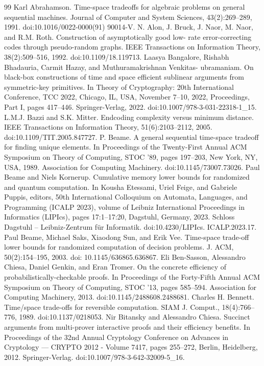 \begin{thebibliography}{99}
 Karl Abrahamson. Time-space tradeoffs for algebraic problems on general sequential machines. Journal of Computer and System Sciences, 43(2):269–289, 1991. doi:10.1016/0022-0000(91) 90014-V.
 N. Alon, J. Bruck, J. Naor, M. Naor, and R.M. Roth. Construction of asymptotically good low- rate error-correcting codes through pseudo-random graphs. IEEE Transactions on Information Theory, 38(2):509–516, 1992. doi:10.1109/18.119713.
 Laasya Bangalore, Rishabh Bhadauria, Carmit Hazay, and Muthuramakrishnan Venkitas- ubramaniam. On black-box constructions of time and space efficient sublinear arguments from symmetric-key primitives. In Theory of Cryptography: 20th International Conference, TCC 2022, Chicago, IL, USA, November 7–10, 2022, Proceedings, Part I, pages 417–446. Springer-Verlag, 2022. doi:10.1007/978-3-031-22318-1\_15.
 L.M.J. Bazzi and S.K. Mitter. Endcoding complexity versus minimum distance. IEEE Transactions on Information Theory, 51(6):2103–2112, 2005. doi:10.1109/TIT.2005.847727.
 P. Beame. A general sequential time-space tradeoff for finding unique elements. In Proceedings of the Twenty-First Annual ACM Symposium on Theory of Computing, STOC ’89, pages 197–203, New York, NY, USA, 1989. Association for Computing Machinery. doi:10.1145/73007.73026.
 Paul Beame and Niels Kornerup. Cumulative memory lower bounds for randomized and quantum computation. In Kousha Etessami, Uriel Feige, and Gabriele Puppis, editors, 50th International Colloquium on Automata, Languages, and Programming (ICALP 2023), volume
 of Leibniz International Proceedings in Informatics (LIPIcs), pages 17:1–17:20, Dagstuhl, Germany, 2023. Schloss Dagstuhl – Leibniz-Zentrum für Informatik. doi:10.4230/LIPIcs. ICALP.2023.17.
 Paul Beame, Michael Saks, Xiaodong Sun, and Erik Vee. Time-space trade-off lower bounds for randomized computation of decision problems. J. ACM, 50(2):154–195, 2003. doi: 10.1145/636865.636867.
 Eli Ben-Sasson, Alessandro Chiesa, Daniel Genkin, and Eran Tromer. On the concrete efficiency of probabilistically-checkable proofs. In Proceedings of the Forty-Fifth Annual ACM Symposium on Theory of Computing, STOC ’13, pages 585–594. Association for Computing Machinery, 2013. doi:10.1145/2488608.2488681.
 Charles H. Bennett. Time/space trade-offs for reversible computation. SIAM J. Comput., 18(4):766–776, 1989. doi:10.1137/0218053.
 Nir Bitansky and Alessandro Chiesa. Succinct arguments from multi-prover interactive proofs and their efficiency benefits. In Proceedings of the 32nd Annual Cryptology Conference on Advances in Cryptology — CRYPTO 2012 - Volume 7417, pages 255–272, Berlin, Heidelberg, 2012. Springer-Verlag. doi:10.1007/978-3-642-32009-5\_16.

\end{thebibliography}
